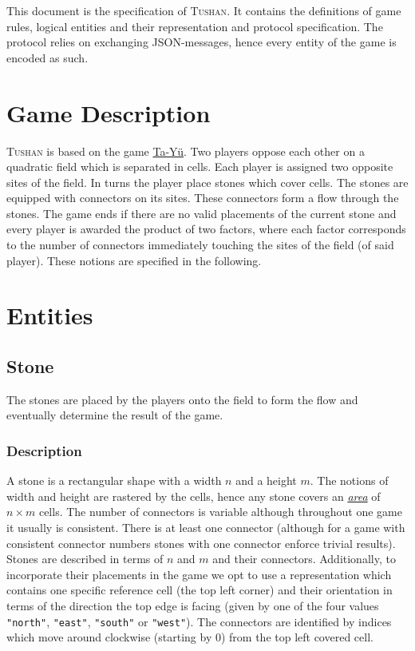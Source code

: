 \documentclass{scrartcl}
\title{\tushan{}}
\author{Voltidioten}
\newcommand{\tushan}{\textsc{Tushan}}
\begin{document}
\maketitle

This document is the specification of \tushan{}. It contains the 
definitions of game rules, logical entities and their representation and 
protocol specification. The protocol relies on exchanging JSON-messages, hence
every entity of the game is encoded as such.

\section{Game Description}
\tushan{} is based on the game 
\href{https://en.wikipedia.org/wiki/Ta\_Y\%C3\%BC}{Ta-Yü}. Two players
oppose each other on a quadratic field which is separated in cells. Each player 
is assigned two opposite sites of the field. In turns the player place stones
which cover cells. The stones are equipped with connectors on its sites. These
connectors form a flow through the stones. The game ends if there are no valid
placements of the current stone and every player is awarded the product of two
factors, where each factor corresponds to the number of connectors immediately
touching the sites of the field (of said player). These notions are specified
in the following.

\section{Entities}

\subsection{Stone}
\hypertarget{stone}{}
The stones are placed by the players onto the field to form the flow and 
eventually determine the result of the game.

\subsubsection{Description}
A stone is a rectangular shape with a width $n$ and a height $m$. The notions 
of width and height are rastered by the cells, hence any stone covers an 
\hyperlink{area}{\emph{area}} of $n\times m$ cells. The number of connectors is 
variable although throughout one game it usually is consistent. There is at 
least one connector (although for a game with consistent connector numbers 
stones with one connector enforce trivial results). Stones are described in 
terms of $n$ and $m$ and their connectors. Additionally, to incorporate their 
placements in the game we opt to use a representation which contains one 
specific reference cell (the top left corner) and their orientation in terms of 
the direction the top edge is facing (given by one of the four values 
\texttt{"north"}, \texttt{"east"}, 
\texttt{"south"} or \texttt{"west"}). The connectors are 
identified by indices which move around clockwise (starting by $0$) from the 
top left covered cell.
\end{document}
